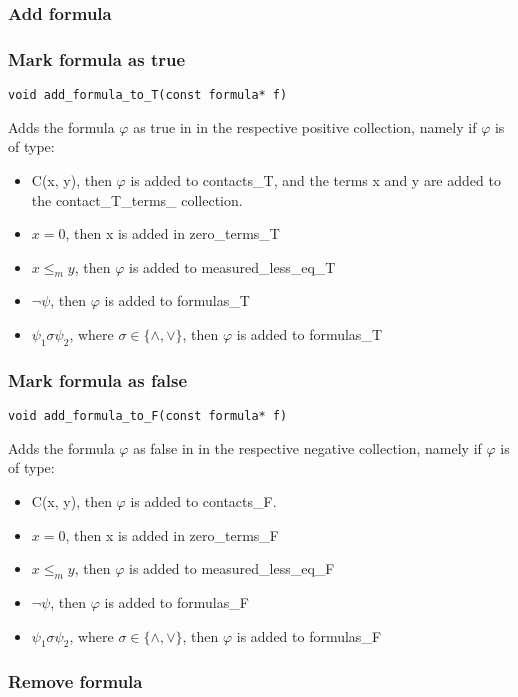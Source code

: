 \documentclass{article}
\begin{document}
			\subsubsection*{Add formula}
			\subsubsection*{Mark formula as true}
				\begin{lstlisting}
void add_formula_to_T(const formula* f)
				\end{lstlisting}
				Adds the formula $\varphi$ as true in in the respective positive collection, namely
				if $\varphi$ is of type:
				\begin{itemize}
					\item C(x, y), then $\varphi$ is added to contacts\_T, and the terms x and y are added to the contact\_T\_terms\_ collection.
					\item $x = 0$, then x is added in zero\_terms\_T
					\item $x \le_m y$, then $\varphi$ is added to measured\_less\_eq\_T
					\item $\neg \psi$, then $\varphi$ is added to formulas\_T
					\item $\psi_1 \sigma \psi_2$, where $\sigma \in \{\wedge, \vee\}$, then $\varphi$ is added to formulas\_T
				\end{itemize}
			\subsubsection*{Mark formula as false}
				\begin{lstlisting}
void add_formula_to_F(const formula* f)
				\end{lstlisting}
				Adds the formula $\varphi$ as false in in the respective negative collection, namely
				if $\varphi$ is of type:
				\begin{itemize}
					\item C(x, y), then $\varphi$ is added to contacts\_F.
					\item $x = 0$, then x is added in zero\_terms\_F
					\item $x \le_m y$, then $\varphi$ is added to measured\_less\_eq\_F
					\item $\neg \psi$, then $\varphi$ is added to formulas\_F
					\item $\psi_1 \sigma \psi_2$, where $\sigma \in \{\wedge, \vee\}$, then $\varphi$ is added to formulas\_F
				\end{itemize}
			\subsubsection*{Remove formula}
\end{document}
